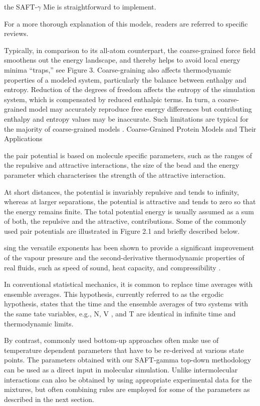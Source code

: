 the SAFT-$\gamma$ Mie is straightforward to implement.

For a more thorough explanation of this models, readers are referred to specific reviews. 


Typically, in comparison to its all-atom counterpart, the coarse-grained force field smoothens out the energy landscape, and thereby helps to avoid local energy minima “traps,” see Figure 3. Coarse-graining also affects thermodynamic properties of a modeled system, particularly the balance between enthalpy and entropy. Reduction of the degrees of freedom affects the entropy of the simulation system, which is compensated by reduced enthalpic terms. In turn, a coarse-grained model may accurately reproduce free energy differences but contributing enthalpy and entropy values may be inaccurate. Such limitations are typical for the majority of coarse-grained models \cite{kmiecik2016}. 
Coarse-Grained Protein Models and Their Applications


the pair potential is based on molecule specific
parameters, such as the ranges of the repulsive and attractive interactions, the size of
the bead and the energy parameter which characterises the strength of the attractive interaction.

At short distances, the potential is
invariably repulsive and tends to infinity, whereas at larger separations, the potential is
attractive and tends to zero so that the energy remains finite. The total potential energy
is usually assumed as a sum of both, the repulsive and the attractive, contributions. Some
of the commonly used pair potentials are illustrated in Figure 2.1 and briefly described
below.

sing the versatile exponents has been shown to provide
a significant improvement of the vapour pressure and the second-derivative thermodynamic
properties of real fluids, such as speed of sound, heat capacity, and compressibility \cite{avendano2011,lafitte2013,lafitte2006}.

In conventional statistical mechanics, it is common to replace time
averages with ensemble averages. This hypothesis, currently referred to as the ergodic
hypothesis, states that the time and the ensemble averages of two systems with the same tate variables, e.g., N, V , and T are identical in infinite time and thermodynamic limits.

By contrast, commonly used
bottom-up approaches often make use of temperature dependent parameters that have to
be re-derived at various state points. The parameters obtained with our SAFT-gamma top-down
methodology can be used as a direct input in molecular simulation. Unlike intermolecular
interactions can also be obtained by using appropriate experimental data for the mixtures,
but often combining rules are employed for some of the parameters as described in the
next section.

